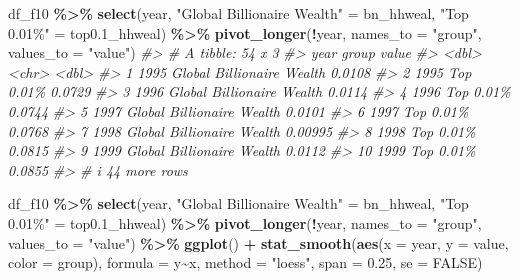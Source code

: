 \documentclass[
  xelatex, ja=standard]{bxjsbook}
\newenvironment{Shaded}{\begin{snugshade}}{\end{snugshade}}
\newcommand{\AttributeTok}[1]{\textcolor[rgb]{0.13,0.29,0.53}{#1}}
\newcommand{\CommentTok}[1]{\textcolor[rgb]{0.56,0.35,0.01}{\textit{#1}}}
\newcommand{\ConstantTok}[1]{\textcolor[rgb]{0.56,0.35,0.01}{#1}}
\newcommand{\FloatTok}[1]{\textcolor[rgb]{0.00,0.00,0.81}{#1}}
\newcommand{\FunctionTok}[1]{\textcolor[rgb]{0.13,0.29,0.53}{\textbf{#1}}}
\newcommand{\NormalTok}[1]{#1}
\newcommand{\OtherTok}[1]{\textcolor[rgb]{0.56,0.35,0.01}{#1}}
\newcommand{\SpecialCharTok}[1]{\textcolor[rgb]{0.81,0.36,0.00}{\textbf{#1}}}
\newcommand{\StringTok}[1]{\textcolor[rgb]{0.31,0.60,0.02}{#1}}
\theoremstyle{definition}
\theoremstyle{definition}
\theoremstyle{definition}
\theoremstyle{definition}
\theoremstyle{remark}
\begin{document}
\begin{Shaded}
\begin{Highlighting}[]
\NormalTok{df\_f10 }\SpecialCharTok{\%\textgreater{}\%} 
  \FunctionTok{select}\NormalTok{(year, }\StringTok{"Global Billionaire Wealth"} \OtherTok{=}\NormalTok{ bn\_hhweal, }\StringTok{"Top 0.01\%"} \OtherTok{=}\NormalTok{ top0}\FloatTok{.1}\NormalTok{\_hhweal) }\SpecialCharTok{\%\textgreater{}\%}
  \FunctionTok{pivot\_longer}\NormalTok{(}\SpecialCharTok{!}\NormalTok{year, }\AttributeTok{names\_to =} \StringTok{"group"}\NormalTok{, }\AttributeTok{values\_to =} \StringTok{"value"}\NormalTok{)}
\CommentTok{\#\textgreater{} \# A tibble: 54 x 3}
\CommentTok{\#\textgreater{}     year group                       value}
\CommentTok{\#\textgreater{}    \textless{}dbl\textgreater{} \textless{}chr\textgreater{}                       \textless{}dbl\textgreater{}}
\CommentTok{\#\textgreater{}  1  1995 Global Billionaire Wealth 0.0108 }
\CommentTok{\#\textgreater{}  2  1995 Top 0.01\%                 0.0729 }
\CommentTok{\#\textgreater{}  3  1996 Global Billionaire Wealth 0.0114 }
\CommentTok{\#\textgreater{}  4  1996 Top 0.01\%                 0.0744 }
\CommentTok{\#\textgreater{}  5  1997 Global Billionaire Wealth 0.0101 }
\CommentTok{\#\textgreater{}  6  1997 Top 0.01\%                 0.0768 }
\CommentTok{\#\textgreater{}  7  1998 Global Billionaire Wealth 0.00995}
\CommentTok{\#\textgreater{}  8  1998 Top 0.01\%                 0.0815 }
\CommentTok{\#\textgreater{}  9  1999 Global Billionaire Wealth 0.0112 }
\CommentTok{\#\textgreater{} 10  1999 Top 0.01\%                 0.0855 }
\CommentTok{\#\textgreater{} \# i 44 more rows}
\end{Highlighting}
\end{Shaded}

\begin{Shaded}
\begin{Highlighting}[]
\NormalTok{df\_f10 }\SpecialCharTok{\%\textgreater{}\%} 
  \FunctionTok{select}\NormalTok{(year, }\StringTok{"Global Billionaire Wealth"} \OtherTok{=}\NormalTok{ bn\_hhweal, }\StringTok{"Top 0.01\%"} \OtherTok{=}\NormalTok{ top0}\FloatTok{.1}\NormalTok{\_hhweal) }\SpecialCharTok{\%\textgreater{}\%}
  \FunctionTok{pivot\_longer}\NormalTok{(}\SpecialCharTok{!}\NormalTok{year, }\AttributeTok{names\_to =} \StringTok{"group"}\NormalTok{, }\AttributeTok{values\_to =} \StringTok{"value"}\NormalTok{) }\SpecialCharTok{\%\textgreater{}\%}
  \FunctionTok{ggplot}\NormalTok{() }\SpecialCharTok{+}
  \FunctionTok{stat\_smooth}\NormalTok{(}\FunctionTok{aes}\NormalTok{(}\AttributeTok{x =}\NormalTok{ year, }\AttributeTok{y =}\NormalTok{ value, }\AttributeTok{color =}\NormalTok{ group), }\AttributeTok{formula =}\NormalTok{ y}\SpecialCharTok{\textasciitilde{}}\NormalTok{x, }\AttributeTok{method =} \StringTok{"loess"}\NormalTok{, }\AttributeTok{span =} \FloatTok{0.25}\NormalTok{, }\AttributeTok{se =} \ConstantTok{FALSE}\NormalTok{)}
\end{Highlighting}
\end{Shaded}
\end{document}
